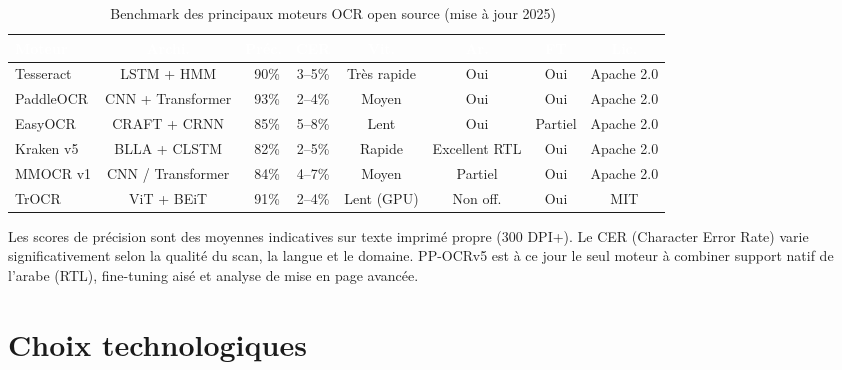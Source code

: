 \begin{table}[H]
  \centering
  \tiny
  \begin{tabular}{|l|c|c|c|c|c|c|c|}
    \toprule
    \rowcolor{bleu_principal}
    \textcolor{white}{\textbf{Moteur}} & \textcolor{white}{\textbf{Archi.}} & \textcolor{white}{\textbf{Préc.}} & \textcolor{white}{\textbf{CER}} & \textcolor{white}{\textbf{Vit.}} & \textcolor{white}{\textbf{Ar.}} & \textcolor{white}{\textbf{FT}} & \textcolor{white}{\textbf{Lic.}} \\
    \midrule
    Tesseract & LSTM + HMM & ~90\% & 3--5\% & Très rapide & Oui & Oui & Apache 2.0 \\
    \midrule
    \rowcolor{gris_leger}
    PaddleOCR & CNN + Transformer & ~93\% & 2--4\% & Moyen & Oui & Oui & Apache 2.0 \\
    \midrule
    EasyOCR & CRAFT + CRNN & ~85\% & 5--8\% & Lent & Oui & Partiel & Apache 2.0 \\
    \midrule
    \rowcolor{gris_leger}
    Kraken v5 & BLLA + CLSTM & ~82\% & 2--5\% & Rapide & Excellent RTL & Oui & Apache 2.0 \\
    \midrule
    MMOCR v1 & CNN / Transformer & ~84\% & 4--7\% & Moyen & Partiel & Oui & Apache 2.0 \\
    \midrule
    \rowcolor{gris_leger}
    TrOCR & ViT + BEiT & ~91\% & 2--4\% & Lent (GPU) & Non off. & Oui & MIT \\
    \bottomrule
  \end{tabular}
  \caption{Benchmark des principaux moteurs OCR open source (mise à jour 2025)~\cite{ocr_benchmark_intuition,ocr_benchmark_acl2024,ocr_benchmark_arxiv2025,ocr_benchmark_koncile2026,ocr_benchmark_cisdem2025,ocr_benchmark_ijraset}}
  \label{tab:ocr-benchmark}
\end{table}

Les scores de précision sont des moyennes indicatives sur texte imprimé propre (300 DPI+). Le CER (Character Error Rate) varie significativement selon la qualité du scan, la langue et le domaine. PP-OCRv5 est à ce jour le seul moteur à combiner support natif de l'arabe (RTL), fine-tuning aisé et analyse de mise en page avancée.


\section{Choix technologiques}
\label{sec:choix-technologiques}

